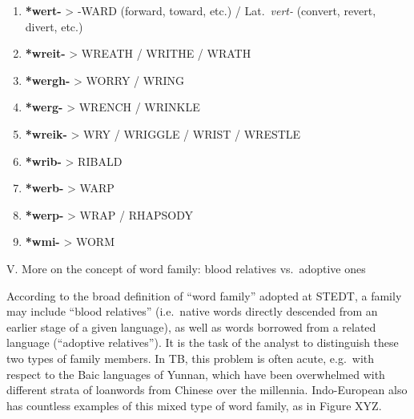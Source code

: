 \begin{enumerate}
\item \textbf{*wert-}	>	-WARD	(forward, toward, etc.) / Lat.\ \textit{vert-} (convert, revert, divert, etc.)

\item \textbf{*wreit-}	>	WREATH / WRITHE / WRATH

\item \textbf{*wergh-}	>	WORRY / WRING

\item \textbf{*werg-}	>	WRENCH / WRINKLE

\item \textbf{*wreik-}	>	WRY / WRIGGLE / WRIST / WRESTLE

\item \textbf{*wrib-}	>	RIBALD

\item \textbf{*werb-}	>	WARP

\item \textbf{*werp-}	>	WRAP / RHAPSODY

\item \textbf{*wmi-}	>	WORM
\end{enumerate}


V. More on the concept of word family: blood relatives vs.\ adoptive ones

According to the broad definition of “word family” adopted at STEDT, a family may include “blood relatives” (i.e.\ native words directly descended from an earlier stage of a given language), as well as words borrowed from a related language (“adoptive relatives”). It is the task of the analyst to distinguish these two types of family members. In TB, this problem is often acute, e.g.\ with respect to the Baic languages of Yunnan, which have been overwhelmed with different strata of loanwords from Chinese over the millennia. Indo-European also has countless examples of this mixed type of word family, as in Figure XYZ.

